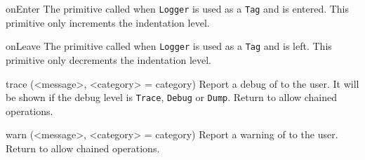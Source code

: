 \begin{urbiscriptapi}
\item[onEnter]%
  The primitive called when \lstinline|Logger| is used as a \lstinline|Tag|
  and is entered. This primitive only increments the indentation level.

\item[onLeave]%
  The primitive called when \lstinline|Logger| is used as a \lstinline|Tag|
  and is left. This primitive only decrements the indentation level.

\item[trace](<message>, <category> = category)%
  Report a debug  of  to the user. It will be
  shown if the debug level is \lstinline|Trace|, \lstinline|Debug| or
  \lstinline|Dump|. Return \this to allow chained operations.

\item[warn](<message>, <category> = category)%
  Report a warning  of  to the user. Return \this
  to allow chained operations.
\end{urbiscriptapi}

